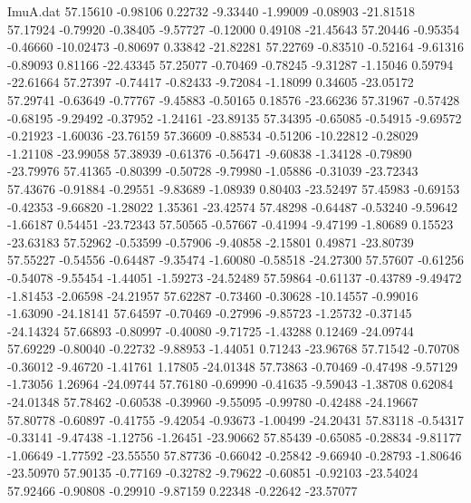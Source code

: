 \begin{filecontents}{ImuA.dat}
  57.15610   -0.98106    0.22732   -9.33440   -1.99009   -0.08903  -21.81518
  57.17924   -0.79920   -0.38405   -9.57727   -0.12000    0.49108  -21.45643
  57.20446   -0.95354   -0.46660  -10.02473   -0.80697    0.33842  -21.82281
  57.22769   -0.83510   -0.52164   -9.61316   -0.89093    0.81166  -22.43345
  57.25077   -0.70469   -0.78245   -9.31287   -1.15046    0.59794  -22.61664
  57.27397   -0.74417   -0.82433   -9.72084   -1.18099    0.34605  -23.05172
  57.29741   -0.63649   -0.77767   -9.45883   -0.50165    0.18576  -23.66236
  57.31967   -0.57428   -0.68195   -9.29492   -0.37952   -1.24161  -23.89135
  57.34395   -0.65085   -0.54915   -9.69572   -0.21923   -1.60036  -23.76159
  57.36609   -0.88534   -0.51206  -10.22812   -0.28029   -1.21108  -23.99058
  57.38939   -0.61376   -0.56471   -9.60838   -1.34128   -0.79890  -23.79976
  57.41365   -0.80399   -0.50728   -9.79980   -1.05886   -0.31039  -23.72343
  57.43676   -0.91884   -0.29551   -9.83689   -1.08939    0.80403  -23.52497
  57.45983   -0.69153   -0.42353   -9.66820   -1.28022    1.35361  -23.42574
  57.48298   -0.64487   -0.53240   -9.59642   -1.66187    0.54451  -23.72343
  57.50565   -0.57667   -0.41994   -9.47199   -1.80689    0.15523  -23.63183
  57.52962   -0.53599   -0.57906   -9.40858   -2.15801    0.49871  -23.80739
  57.55227   -0.54556   -0.64487   -9.35474   -1.60080   -0.58518  -24.27300
  57.57607   -0.61256   -0.54078   -9.55454   -1.44051   -1.59273  -24.52489
  57.59864   -0.61137   -0.43789   -9.49472   -1.81453   -2.06598  -24.21957
  57.62287   -0.73460   -0.30628  -10.14557   -0.99016   -1.63090  -24.18141
  57.64597   -0.70469   -0.27996   -9.85723   -1.25732   -0.37145  -24.14324
  57.66893   -0.80997   -0.40080   -9.71725   -1.43288    0.12469  -24.09744
  57.69229   -0.80040   -0.22732   -9.88953   -1.44051    0.71243  -23.96768
  57.71542   -0.70708   -0.36012   -9.46720   -1.41761    1.17805  -24.01348
  57.73863   -0.70469   -0.47498   -9.57129   -1.73056    1.26964  -24.09744
  57.76180   -0.69990   -0.41635   -9.59043   -1.38708    0.62084  -24.01348
  57.78462   -0.60538   -0.39960   -9.55095   -0.99780   -0.42488  -24.19667
  57.80778   -0.60897   -0.41755   -9.42054   -0.93673   -1.00499  -24.20431
  57.83118   -0.54317   -0.33141   -9.47438   -1.12756   -1.26451  -23.90662
  57.85439   -0.65085   -0.28834   -9.81177   -1.06649   -1.77592  -23.55550
  57.87736   -0.66042   -0.25842   -9.66940   -0.28793   -1.80646  -23.50970
  57.90135   -0.77169   -0.32782   -9.79622   -0.60851   -0.92103  -23.54024
  57.92466   -0.90808   -0.29910   -9.87159    0.22348   -0.22642  -23.57077

\end{filecontents}
